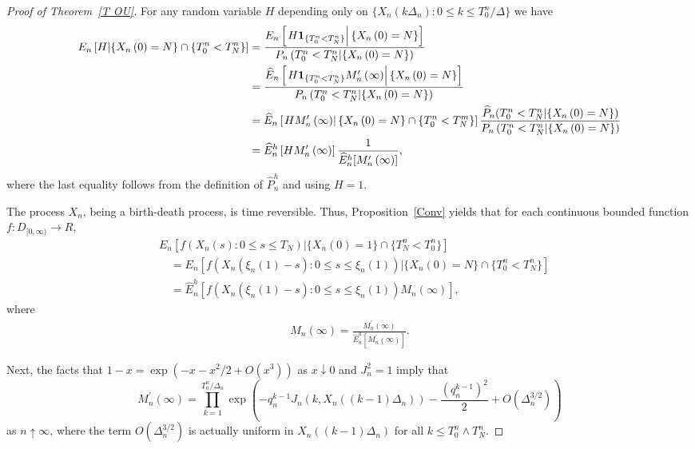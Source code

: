 \begin{proof}[Proof of Theorem~\ref{T OU}]
For any random variable $H$ depending only on $\{X_{n}( k\Delta_n)
:0\leq k\leq T_{0}^{n}/\Delta \}$ we have
\begin{align}
E_{n}\left[ H|\{X_{n}\left( 0\right) =N\}\cap \{T_{0}^{n}<T_{N}^{n}\}\right]
& =\frac{E_{n}\left[ \left. H\mathbf{1}_{\{T_{0}^{n}<T_{N}^{n}\}}\right\vert
\{X_{n}\left( 0\right) =N\}\right] }{P_{n}\left(
T_{0}^{n}<T_{N}^{n}|\{X_{n}\left( 0\right) =N\}\right) } \nonumber \\
& =\frac{\widehat{E}_{n}\left[ \left. H\mathbf{1}_{\{T_{0}^{n}<T_{N}^{n}%
\}}M_{n}^{\prime }\left( \infty \right) \right\vert \{X_{n}\left( 0\right)
=N\}\right] }{P_{n}\left( T_{0}^{n}<T_{N}^{n}|\{X_{n}\left( 0\right)
=N\}\right) }\nonumber \\
& =\widehat{E}_{n}\left[ \left. HM_{n}^{\prime }\left( \infty \right)
\right\vert \{X_{n}\left( 0\right) =N\}\cap \{T_{0}^{n}<T_{N}^{m}\}\right]
\frac{\widehat{P}_{n}(T_{0}^{n}<T_{N}^{n}|\{X_{n}\left( 0\right) =N\})}{%
P_n\left( T_{0}^{n}<T_{N}^{n}|\{X_{n}\left( 0\right) =N\}\right) } \nonumber\\
& =\widehat{E}^{h}_{n}\left[ HM_{n}^{\prime }\left( \infty \right) \right]
\frac{1}{\widehat{E}^{h}_{n}[M_{n}^{\prime }\left( \infty \right)]},  \label{eq:6}
\end{align}%
where the last equality follows from the definition of $\widehat{P}^{h}_{n}$
and using $H=1$.

The process $X_{n}$, being a birth-death process, is
time reversible. Thus,
Proposition~\ref{Conv} yields that for each continuous bounded function $f: D_{[0,\infty )} \rightarrow R$,%
\begin{align*}
& E_{n}\left[ f(X_{n}(s):0\leq s\leq T_{N})|\{X_{n}\left( 0\right) =1\}\cap
\{T_{N}^{n}<T_{0}^{n}\}\right]  \\
& \quad =E_{n}\left[ f\left( X_{n}\left( \xi _{n}(1)-s\right) :0\leq s\leq
\xi _{n}(1)\right) |\{X_{n}\left( 0\right) =N\}\cap \{T_{0}^{n}<T_{N}^{n}\}%
\right]  \\
& \quad =\widehat{E}^{h}_{n}\left[ f\left( X_{n}\left( \xi _{n}(1)-s\right)
:0\leq s\leq \xi _{n}(1)\right) M_{n}\left( \infty \right) \right] ,
\end{align*}%
where
\begin{align} \label{eq: Mn}
	M_{n}\left( \infty \right) = \frac{M_{n}^{\prime }\left( \infty \right)}{
\widehat{E}^{h}_{n}[M_{n}^{\prime }\left( \infty \right) ]}.
\end{align}

Next, the facts that $1-x=\exp \left( -x-x^{2}/2+O\left( x^{3}\right)
\right) $ as $x\downarrow 0$ and $J_{n}^{2}=1$ imply that
\begin{equation*}
M_{n}^{\prime }\left( \infty \right) =\prod_{k=1}^{T_{0}^{n}/\Delta
_{n}}\exp \left( -q_{n}^{k-1}J_{n}\left( k,X_{n}\left( \left(
k-1\right) \Delta _{n}\right) \right) -\frac{(q_{n}^{k-1})^{2}}{2}%
+O(\Delta _{n}^{3/2})\right)
\end{equation*}%
as $n\uparrow \infty $, where the term $O(\Delta _{n}^{3/2})$ is actually
uniform in $X_{n}\left( ( k-1) \Delta _{n}\right) $ for all $%
k\leq T_{0}^{n}\wedge T_{N}^{n}$.


\end{proof}
